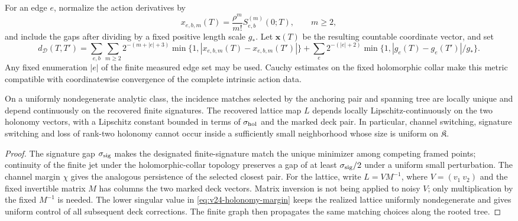 For an edge \(e\), normalize the action derivatives by
\[
 x_{e,b,m}(T)=\frac{\rho^m}{m!}S_{e,b}^{(m)}(0;T),
 \qquad m\ge2,
\]
and include the gaps after dividing by a fixed positive length scale
\(g_*\).  Let \(\mathbf x(T)\) be the resulting countable coordinate vector,
and set
\begin{equation}\label{eq:v24-data-metric}
 d_{\mathcal D}(T,T')
 =\sum_{e,b}\sum_{m\ge2}2^{-(m+|e|+3)}
       \min\{1,|x_{e,b,m}(T)-x_{e,b,m}(T')|\}
  +\sum_e2^{-(|e|+2)}
       \min\{1,|g_e(T)-g_e(T')|/g_*\}.
\end{equation}
Any fixed enumeration \(|e|\) of the finite measured edge set may be used.
Cauchy estimates on the fixed holomorphic collar make this metric compatible
with coordinatewise convergence of the complete intrinsic action data.

\begin{lemma}
\label{lem:v24-gluing-persistence}
On a uniformly nondegenerate analytic class, the incidence matches selected by
the anchoring pair and spanning tree are locally unique and depend
continuously on the recovered finite signatures.  The recovered lattice map
\(L\) depends locally Lipschitz-continuously on the two holonomy vectors, with
a Lipschitz constant bounded in terms of \(\sigma_{\rm hol}\) and the marked
deck pair.  In particular, channel switching, signature switching and loss of
rank-two holonomy cannot occur inside a sufficiently small neighborhood whose
size is uniform on \(\mathfrak K\).
\end{lemma}

\begin{proof}
The signature gap \(\sigma_{\rm sig}\) makes the designated finite-signature
match the unique minimizer among competing framed points; continuity of the
finite jet under the holomorphic-collar topology preserves a gap of at least
\(\sigma_{\rm sig}/2\) under a uniform small perturbation.  The channel margin
\(\chi\) gives the analogous persistence of the selected closest pair.
For the lattice, write \(L=VM^{-1}\), where
\(V=(v_1\ v_2)\) and the fixed invertible matrix \(M\) has columns the two
marked deck vectors.  Matrix inversion is not being applied to noisy \(V\);
only multiplication by the fixed \(M^{-1}\) is needed.  The lower singular
value in \eqref{eq:v24-holonomy-margin} keeps the realized lattice uniformly
nondegenerate and gives uniform control of all subsequent deck corrections.
The finite graph then propagates the same matching choices along the rooted
tree.
\end{proof}

